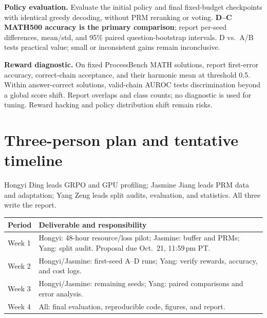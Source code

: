 \documentclass{article}
\begin{document}
\textbf{Policy evaluation.} Evaluate the initial policy and final fixed-budget checkpoints with identical greedy decoding, without PRM reranking or voting. \textbf{D--C MATH500 accuracy is the primary comparison}; report per-seed differences, mean/std, and 95\% paired question-bootstrap intervals. D vs.\ A/B tests practical value; small or inconsistent gains remain inconclusive.

\textbf{Reward diagnostic.} On fixed ProcessBench MATH solutions, report first-error accuracy, correct-chain acceptance, and their harmonic mean at threshold 0.5. Within answer-correct solutions, valid-chain AUROC tests discrimination beyond a global score shift. Report overlaps and class counts; no diagnostic is used for tuning. Reward hacking and policy distribution shift remain risks.

\section{Three-person plan and tentative timeline}
Hongyi Ding leads GRPO and GPU profiling; Jasmine Jiang leads PRM data and adaptation; Yang Zeng leads split audits, evaluation, and statistics. All three write the report.
\begin{center}
\small
\renewcommand{\arraystretch}{1.1}
\begin{tabularx}{\linewidth}{@{}l L@{}}
\toprule
\textbf{Period} & \textbf{Deliverable and responsibility} \\
\midrule
Week 1 & Hongyi: 48-hour resource/loss pilot; Jasmine: buffer and PRMs; Yang: split audit. Proposal due Oct.\ 21, 11:59\,pm PT. \\
Week 2 & Hongyi/Jasmine: first-seed A--D runs; Yang: verify rewards, accuracy, and cost logs. \\
Week 3 & Hongyi/Jasmine: remaining seeds; Yang: paired comparisons and error analysis. \\
Week 4 & All: final evaluation, reproducible code, figures, and report. \\
\bottomrule
\end{tabularx}
\end{center}
\clearpage
\end{document}
